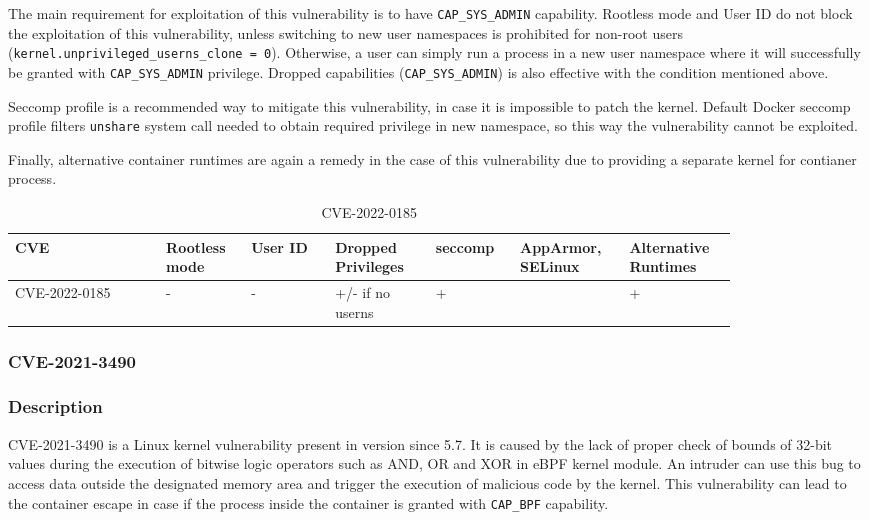 The main requirement for exploitation of this vulnerability is to have  \texttt{CAP\_SYS\_ADMIN} capability. Rootless mode and User ID do not block the exploitation of this vulnerability, unless switching to new user namespaces is prohibited for non-root users (\texttt{kernel.unprivileged\_userns\_clone = 0}). Otherwise, a user can simply run a process in a new user namespace where it will successfully be granted with \texttt{CAP\_SYS\_ADMIN} privilege. Dropped capabilities (\texttt{CAP\_SYS\_ADMIN}) is also effective with the condition mentioned above.

Seccomp profile is a recommended way to mitigate this vulnerability, in case it is impossible to patch the kernel. Default Docker seccomp profile filters \texttt{unshare} system call needed to obtain required privilege in new namespace, so this way the vulnerability cannot be exploited.

Finally, alternative container runtimes are again a remedy in the case of this vulnerability due to providing a separate kernel for contianer process.

\begin{table}[H]
    \centering \small
    \begin{tabular}{| p{0.18\linewidth} | p{0.1\linewidth} | p{0.1\linewidth} | p{0.12\linewidth} | p{0.1\linewidth} | p{0.12\linewidth} | p{0.12\linewidth} |} \hline
    CVE & Rootless mode & User ID & Dropped Privileges & seccomp & AppArmor, SELinux & Alternative Runtimes \\ \hline
    CVE-2022-0185 & - & - & \cellcolor{yellow!25} +/- \linebreak if no userns & \cellcolor{green!25} + &  & \cellcolor{green!25} + \\ \hline
    \end{tabular}
    \caption{CVE-2022-0185}
    \label{tab:h:3}
\end{table}


\subsubsection{CVE-2021-3490}
\subsubsection*{Description}

CVE-2021-3490 is a Linux kernel vulnerability present in version since 5.7. It is caused by the lack of proper check of bounds of 32-bit values during the execution of bitwise logic operators such as AND, OR and XOR in eBPF kernel module. An intruder can use this bug to access data outside the designated memory area and trigger the execution of malicious code by the kernel. This vulnerability can lead to the container escape in case if the process inside the container is granted with \texttt{CAP\_BPF} capability.


